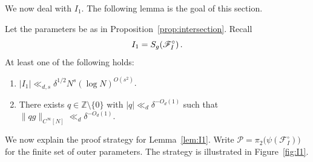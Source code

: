 We now deal with $I_1$. The following lemma is the goal of this section.

\begin{lemma}\label{lem:I1}
Let the parameters be as in Proposition~\ref{prop:intersection}.
Recall
\[
I_1=S_g\!\left(\mathscr{F}_I^\circ\right).
\]
At least one of the following holds:
\begin{enumerate}
    \item $|I_1|\ll_{d,s} \delta^{1/2} N^s(\log N)^{O(s^2)}$.
    \item There exists $q\in\mathbb{Z}\setminus\{0\}$ with $|q|\ll_d\delta^{-O_d(1)}$ such that $\|qg\|_{C^\infty[N]}\ll_d\delta^{-O_d(1)}$.
\end{enumerate}
\end{lemma}

We now explain the proof strategy for Lemma~\ref{lem:I1}.
Write \(\mathscr{P}=\pi_2\bigl(\psi(\mathscr{F}_I^\circ)\bigr)\) for the finite set of outer parameters.
The strategy is illustrated in Figure~\ref{fig:I1}.
